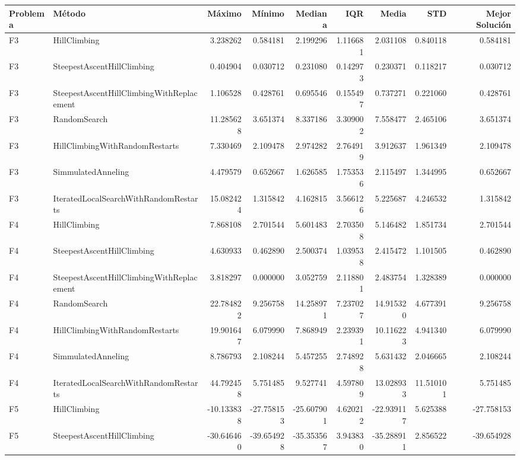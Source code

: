 \begin{tabular}{llrrrrrrr}
\toprule
Problema & Método & Máximo & Mínimo & Mediana & IQR & Media & STD & Mejor Solución \\
\midrule
F3 & HillClimbing & 3.238262 & 0.584181 & 2.199296 & 1.116681 & 2.031108 & 0.840118 & 0.584181 \\
F3 & SteepestAscentHillClimbing & 0.404904 & 0.030712 & 0.231080 & 0.142973 & 0.230371 & 0.118217 & 0.030712 \\
F3 & SteepestAscentHillClimbingWithReplacement & 1.106528 & 0.428761 & 0.695546 & 0.155497 & 0.737271 & 0.221060 & 0.428761 \\
F3 & RandomSearch & 11.285628 & 3.651374 & 8.337186 & 3.309002 & 7.558477 & 2.465106 & 3.651374 \\
F3 & HillClimbingWithRandomRestarts & 7.330469 & 2.109478 & 2.974282 & 2.764919 & 3.912637 & 1.961349 & 2.109478 \\
F3 & SimmulatedAnneling & 4.479579 & 0.652667 & 1.626585 & 1.753536 & 2.115497 & 1.344995 & 0.652667 \\
F3 & IteratedLocalSearchWithRandomRestarts & 15.082424 & 1.315842 & 4.162815 & 3.566126 & 5.225687 & 4.246532 & 1.315842 \\
F4 & HillClimbing & 7.868108 & 2.701544 & 5.601483 & 2.703508 & 5.146482 & 1.851734 & 2.701544 \\
F4 & SteepestAscentHillClimbing & 4.630933 & 0.462890 & 2.500374 & 1.039538 & 2.415472 & 1.101505 & 0.462890 \\
F4 & SteepestAscentHillClimbingWithReplacement & 3.818297 & 0.000000 & 3.052759 & 2.118801 & 2.483754 & 1.328389 & 0.000000 \\
F4 & RandomSearch & 22.784822 & 9.256758 & 14.258971 & 7.237027 & 14.915320 & 4.677391 & 9.256758 \\
F4 & HillClimbingWithRandomRestarts & 19.901647 & 6.079990 & 7.868949 & 2.239391 & 10.116223 & 4.941340 & 6.079990 \\
F4 & SimmulatedAnneling & 8.786793 & 2.108244 & 5.457255 & 2.748928 & 5.631432 & 2.046665 & 2.108244 \\
F4 & IteratedLocalSearchWithRandomRestarts & 44.792458 & 5.751485 & 9.527741 & 4.597809 & 13.028933 & 11.510101 & 5.751485 \\
F5 & HillClimbing & -10.133838 & -27.758153 & -25.607901 & 4.620212 & -22.939117 & 5.625388 & -27.758153 \\
F5 & SteepestAscentHillClimbing & -30.646460 & -39.654928 & -35.353567 & 3.943830 & -35.288911 & 2.856522 & -39.654928 \\

\end{tabular}
